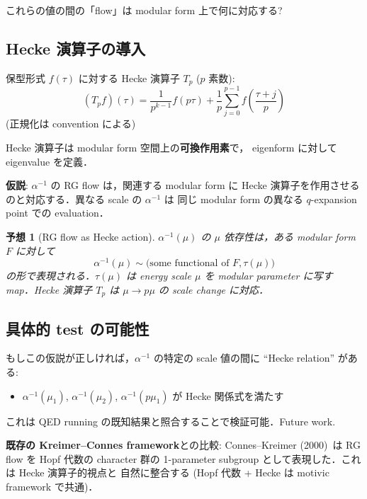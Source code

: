 \documentclass[11pt,a4paper]{article}
\newtheorem{conjecture}{予想}
\begin{document}
これらの値の間の「flow」は modular form 上で何に対応する?

\subsection{Hecke 演算子の導入}

保型形式 $f(\tau)$ に対する Hecke 演算子 $T_p$ ($p$ 素数):
\begin{equation}
(T_p f)(\tau) = \frac{1}{p^{k-1}}f(p\tau) + \frac{1}{p}\sum_{j=0}^{p-1}f\left(\frac{\tau+j}{p}\right)
\end{equation}
(正規化は convention による)

Hecke 演算子は modular form 空間上の\textbf{可換作用素}で，
eigenform に対して eigenvalue を定義．

\textbf{仮説}: $\alpha^{-1}$ の RG flow は，関連する modular form に
Hecke 演算子を作用させるのと対応する．異なる scale の $\alpha^{-1}$ は
同じ modular form の異なる $q$-expansion point での evaluation．

\begin{conjecture}[RG flow as Hecke action]
$\alpha^{-1}(\mu)$ の $\mu$ 依存性は，ある modular form $F$ に対して
\begin{equation}
\alpha^{-1}(\mu) \sim \text{(some functional of } F, \tau(\mu))
\end{equation}
の形で表現される．$\tau(\mu)$ は energy scale $\mu$ を modular parameter
に写す map．Hecke 演算子 $T_p$ は $\mu \to p\mu$ の scale change に対応．
\end{conjecture}

\subsection{具体的 test の可能性}

もしこの仮説が正しければ，$\alpha^{-1}$ の特定の scale 値の間に
``Hecke relation'' がある:
\begin{itemize}
\item $\alpha^{-1}(\mu_1)$, $\alpha^{-1}(\mu_2)$, $\alpha^{-1}(p \mu_1)$
が Hecke 関係式を満たす
\end{itemize}

これは QED running の既知結果と照合することで検証可能．Future work.

\textbf{既存の Kreimer--Connes framework}との比較: Connes--Kreimer
(2000)~\cite{ConnesKreimer2000}は RG flow を Hopf 代数の character 群の
1-parameter subgroup として表現した．これは Hecke 演算子的視点と
自然に整合する (Hopf 代数 + Hecke は motivic framework で共通)．
\end{document}
